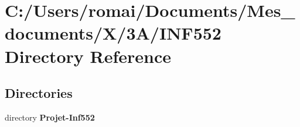 \section{C\+:/\+Users/romai/\+Documents/\+Mes\+\_\+documents/\+X/3\+A/\+I\+N\+F552 Directory Reference}
\label{dir_fd8eafe0c5c76b6bc58c7988991685c4}
\subsection*{Directories}
\begin{DoxyCompactItemize}
\item 
directory \textbf{ Projet-\/\+Inf552}
\end{DoxyCompactItemize}
